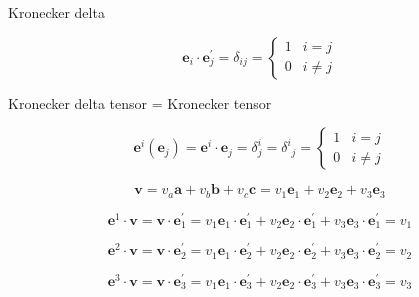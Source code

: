 \documentclass[
]{book}
\theoremstyle{definition}
\theoremstyle{definition}
\theoremstyle{definition}
\theoremstyle{definition}
\theoremstyle{remark}
\begin{document}
Kronecker delta

\[
\boldsymbol{e}_{{\scriptscriptstyle i}}\cdot\boldsymbol{e}_{{\scriptscriptstyle j}}^{\prime}=\delta_{{\scriptscriptstyle ij}}=\begin{cases}
1 & i=j\\
0 & i\ne j
\end{cases}
\]

Kronecker delta tensor = Kronecker tensor

\[
\boldsymbol{e}^{{\scriptscriptstyle i}}\left(\boldsymbol{e}_{{\scriptscriptstyle j}}\right)=\boldsymbol{e}^{{\scriptscriptstyle i}}\cdot\boldsymbol{e}_{{\scriptscriptstyle j}}=\delta_{{\scriptscriptstyle j}}^{{\scriptscriptstyle i}}=\delta^{{\scriptscriptstyle i}}{}_{{\scriptscriptstyle j}}=\begin{cases}
1 & i=j\\
0 & i\ne j
\end{cases}
\]

\[
\boldsymbol{v}=v_{{\scriptscriptstyle a}}\boldsymbol{a}+v_{{\scriptscriptstyle b}}\boldsymbol{b}+v_{{\scriptscriptstyle c}}\boldsymbol{c}=v_{{\scriptscriptstyle 1}}\boldsymbol{e}_{{\scriptscriptstyle 1}}+v_{{\scriptscriptstyle 2}}\boldsymbol{e}_{{\scriptscriptstyle 2}}+v_{{\scriptscriptstyle 3}}\boldsymbol{e}_{{\scriptscriptstyle 3}}
\]

\[
\boldsymbol{e}^{{\scriptscriptstyle 1}}\cdot\boldsymbol{v}=\boldsymbol{v}\cdot\boldsymbol{e}_{{\scriptscriptstyle 1}}^{\prime}=v_{{\scriptscriptstyle 1}}\boldsymbol{e}_{{\scriptscriptstyle 1}}\cdot\boldsymbol{e}_{{\scriptscriptstyle 1}}^{\prime}+v_{{\scriptscriptstyle 2}}\boldsymbol{e}_{{\scriptscriptstyle 2}}\cdot\boldsymbol{e}_{{\scriptscriptstyle 1}}^{\prime}+v_{{\scriptscriptstyle 3}}\boldsymbol{e}_{{\scriptscriptstyle 3}}\cdot\boldsymbol{e}_{{\scriptscriptstyle 1}}^{\prime}=v_{{\scriptscriptstyle 1}}
\]

\[
\boldsymbol{e}^{{\scriptscriptstyle 2}}\cdot\boldsymbol{v}=\boldsymbol{v}\cdot\boldsymbol{e}_{{\scriptscriptstyle 2}}^{\prime}=v_{{\scriptscriptstyle 1}}\boldsymbol{e}_{{\scriptscriptstyle 1}}\cdot\boldsymbol{e}_{{\scriptscriptstyle 2}}^{\prime}+v_{{\scriptscriptstyle 2}}\boldsymbol{e}_{{\scriptscriptstyle 2}}\cdot\boldsymbol{e}_{{\scriptscriptstyle 2}}^{\prime}+v_{{\scriptscriptstyle 3}}\boldsymbol{e}_{{\scriptscriptstyle 3}}\cdot\boldsymbol{e}_{{\scriptscriptstyle 2}}^{\prime}=v_{{\scriptscriptstyle 2}}
\]

\[
\boldsymbol{e}^{{\scriptscriptstyle 3}}\cdot\boldsymbol{v}=\boldsymbol{v}\cdot\boldsymbol{e}_{{\scriptscriptstyle 3}}^{\prime}=v_{{\scriptscriptstyle 1}}\boldsymbol{e}_{{\scriptscriptstyle 1}}\cdot\boldsymbol{e}_{{\scriptscriptstyle 3}}^{\prime}+v_{{\scriptscriptstyle 2}}\boldsymbol{e}_{{\scriptscriptstyle 2}}\cdot\boldsymbol{e}_{{\scriptscriptstyle 3}}^{\prime}+v_{{\scriptscriptstyle 3}}\boldsymbol{e}_{{\scriptscriptstyle 3}}\cdot\boldsymbol{e}_{{\scriptscriptstyle 3}}^{\prime}=v_{{\scriptscriptstyle 3}}
\]
\end{document}
